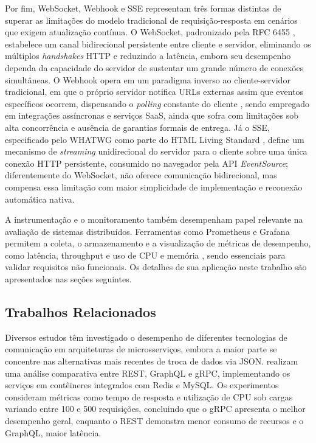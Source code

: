 \documentclass[a4paper,12pt]{article}
\begin{document}
Por fim, WebSocket, Webhook e SSE representam três formas distintas de superar as limitações do modelo tradicional de requisição-resposta em cenários que exigem atualização contínua. O WebSocket, padronizado pela RFC 6455 \cite{rfc6455}, estabelece um canal bidirecional persistente entre cliente e servidor, eliminando os múltiplos \textit{handshakes} HTTP e reduzindo a latência, embora seu desempenho dependa da capacidade do servidor de sustentar um grande número de conexões simultâneas. O Webhook opera em um paradigma inverso ao cliente-servidor tradicional, em que o próprio servidor notifica URLs externas assim que eventos específicos ocorrem, dispensando o \textit{polling} constante do cliente \cite{webhookdoc}, sendo empregado em integrações assíncronas e serviços SaaS, ainda que sofra com limitações sob alta concorrência e ausência de garantias formais de entrega. Já o SSE, especificado pelo WHATWG como parte do HTML Living Standard \cite{whatwg2024sse}, define um mecanismo de \textit{streaming} unidirecional do servidor para o cliente sobre uma única conexão HTTP persistente, consumido no navegador pela API \textit{EventSource}; diferentemente do WebSocket, não oferece comunicação bidirecional, mas compensa essa limitação com maior simplicidade de implementação e reconexão automática nativa.

A instrumentação e o monitoramento também desempenham papel relevante na avaliação de sistemas distribuídos. Ferramentas como Prometheus e Grafana permitem a coleta, o armazenamento e a visualização de métricas de desempenho, como latência, throughput e uso de CPU e memória \cite{turnbull2014monitoring}, sendo essenciais para validar requisitos não funcionais. Os detalhes de sua aplicação neste trabalho são apresentados nas seções seguintes.

\subsection{Trabalhos Relacionados}

Diversos estudos têm investigado o desempenho de diferentes tecnologias de comunicação em arquiteturas de microsserviços, embora a maior parte se concentre nas alternativas mais recentes de troca de dados via JSON.  realizam uma análise comparativa entre REST, GraphQL e gRPC, implementando os serviços em contêineres integrados com Redis e MySQL. Os experimentos consideram métricas como tempo de resposta e utilização de CPU sob cargas variando entre 100 e 500 requisições, concluindo que o gRPC apresenta o melhor desempenho geral, enquanto o REST demonstra menor consumo de recursos e o GraphQL, maior latência.
\end{document}
